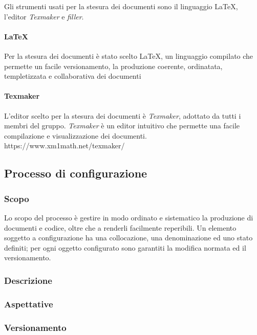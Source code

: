 Gli strumenti usati per la stesura dei documenti sono il linguaggio \LaTeX, l'editor \textit{Texmaker} e \textit{filler}.

\paragraph{\LaTeX}

Per la stesura dei documenti è stato scelto \LaTeX, un linguaggio compilato che permette un facile versionamento, la produzione coerente, ordinatata, templetizzata e collaborativa dei documenti

\paragraph{Texmaker}

L'editor scelto per la stesura dei documenti è \textit{Texmaker}, adottato da tutti i membri del gruppo. \textit{Texmaker} è un editor intuitivo che permette una facile compilazione e visualizzazione dei documenti.\newline
https://www.xm1math.net/texmaker/

\subsection{Processo di configurazione}

\subsubsection{Scopo}

Lo scopo del processo è gestire in modo ordinato e sistematico la produzione di documenti e codice, oltre che a renderli facilmente reperibili. Un elemento soggetto a configurazione ha una collocazione, una denominazione ed uno stato definiti; per ogni oggetto configurato sono garantiti la modifica normata ed il versionamento.

\subsubsection{Descrizione}

\subsubsection{Aspettative}

\subsubsection{Versionamento}

